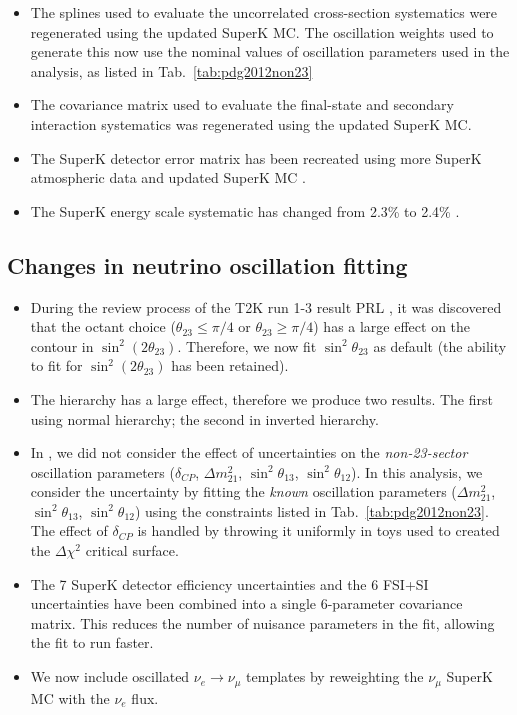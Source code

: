 \begin{itemize}
\item The splines used to evaluate the uncorrelated cross-section
  systematics were regenerated using the updated SuperK MC. The
  oscillation weights used to generate this now use the nominal values
  of oscillation parameters used in the analysis, as listed in Tab.~\ref{tab:pdg2012non23}
\item The covariance matrix used to evaluate the final-state and secondary interaction
  systematics was regenerated using the updated SuperK MC.
\item The SuperK detector error matrix has been recreated using more
  SuperK atmospheric data and updated SuperK MC
  \cite{SuperkErrors2013}.
\item The SuperK energy scale systematic has changed from 2.3\% to 2.4\% \cite{SuperkEScale2013}.
\end{itemize}

\subsection{Changes in neutrino oscillation fitting}

\begin{itemize}
\item During the review process of the T2K run 1-3 result PRL \cite{T2KRun123Disapp}, it was
  discovered that the octant choice ($\theta_{23} \leq \pi/4$ or
  $\theta_{23} \geq \pi/4$) has a large effect on the contour in $\sin^2(2\theta_{23})$.
  Therefore, we now fit $\sin^2\theta_{23}$ as default
  (the ability to fit for $\sin^2(2\theta_{23})$ has been retained).
\item The hierarchy has a large effect, therefore we produce two
  results. The first using normal hierarchy; the second in inverted hierarchy.
\item In \cite{OurRun123DisappAnalysis3Flavour}, we did not consider
  the effect of uncertainties on the \emph{non-23-sector} oscillation
  parameters ($\delta_{CP}$, $\Delta m^2_{21}$, $\sin^2\theta_{13}$,
  $\sin^2\theta_{12}$). In this analysis, we consider the
  uncertainty by fitting the \emph{known} oscillation parameters ($\Delta m^2_{21}$, $\sin^2\theta_{13}$,
  $\sin^2\theta_{12}$) using the constraints listed in
  Tab.~\ref{tab:pdg2012non23}. The effect of $\delta_{CP}$ is handled
  by throwing it uniformly in toys used to created the $\Delta \chi^2$
  critical surface.
\item The 7 SuperK detector efficiency uncertainties and the 6 FSI+SI
  uncertainties have been combined into a single 6-parameter
  covariance matrix.
  This reduces the number of nuisance parameters in the fit, allowing
  the fit to run faster.
\item We now include oscillated $\nu_e \rightarrow \nu_\mu$ templates by
  reweighting the $\nu_\mu$ SuperK MC with the $\nu_e$ flux.
\end{itemize}


